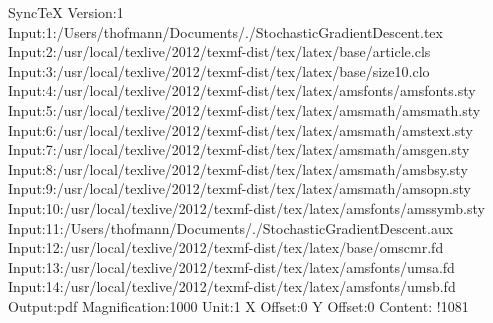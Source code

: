 SyncTeX Version:1
Input:1:/Users/thofmann/Documents/./StochasticGradientDescent.tex
Input:2:/usr/local/texlive/2012/texmf-dist/tex/latex/base/article.cls
Input:3:/usr/local/texlive/2012/texmf-dist/tex/latex/base/size10.clo
Input:4:/usr/local/texlive/2012/texmf-dist/tex/latex/amsfonts/amsfonts.sty
Input:5:/usr/local/texlive/2012/texmf-dist/tex/latex/amsmath/amsmath.sty
Input:6:/usr/local/texlive/2012/texmf-dist/tex/latex/amsmath/amstext.sty
Input:7:/usr/local/texlive/2012/texmf-dist/tex/latex/amsmath/amsgen.sty
Input:8:/usr/local/texlive/2012/texmf-dist/tex/latex/amsmath/amsbsy.sty
Input:9:/usr/local/texlive/2012/texmf-dist/tex/latex/amsmath/amsopn.sty
Input:10:/usr/local/texlive/2012/texmf-dist/tex/latex/amsfonts/amssymb.sty
Input:11:/Users/thofmann/Documents/./StochasticGradientDescent.aux
Input:12:/usr/local/texlive/2012/texmf-dist/tex/latex/base/omscmr.fd
Input:13:/usr/local/texlive/2012/texmf-dist/tex/latex/amsfonts/umsa.fd
Input:14:/usr/local/texlive/2012/texmf-dist/tex/latex/amsfonts/umsb.fd
Output:pdf
Magnification:1000
Unit:1
X Offset:0
Y Offset:0
Content:
!1081
